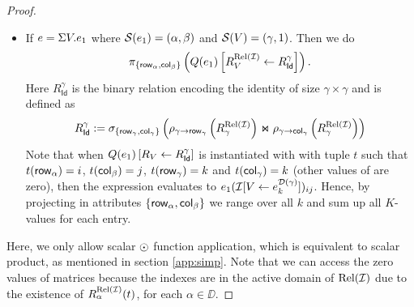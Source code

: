\begin{proof}
\begin{itemize}
  \item If $e=\Sigma V. e_1$ where $\mathcal{S}(e_1)=(\alpha,\beta)$ and $\mathcal{S}(V)=(\gamma,1)$. Then we do 
  $$
  \pi_{\lbrace \mathsf{row}_{\alpha}, \mathsf{col}_{\beta} \rbrace}\left( Q (e_1)\left[ R_{V}^{\text{Rel}(\mathcal{I})}\leftarrow R_{\mathsf{Id}}^{\gamma} \right] \right).
  $$
  Here $R_{\mathsf{Id}}^{\gamma}$ is the binary relation encoding the identity of size $\gamma\times\gamma$ and
  is defined as 
  $$
  R_{\mathsf{Id}}^{\gamma}:= \sigma_{\lbrace \mathsf{row}_{\gamma},\mathsf{col}_{\gamma} \rbrace }\left( \rho_{\gamma\rightarrow\mathsf{row}_\gamma}\left( R_\gamma^{\text{Rel}(\mathcal{I})} \right) \Join \rho_{\gamma\rightarrow\mathsf{col}_\gamma}\left( R_\gamma^{\text{Rel}(\mathcal{I})} \right)\right)
  $$
  Note that when $Q (e_1)\left[ R_{V}\leftarrow R_{\mathsf{Id}}^{\gamma} \right]$ is instantiated with with tuple $t$ such that $t(\mathsf{row}_\alpha)=i$, $t(\mathsf{col}_\beta)=j$, 
  $t(\mathsf{row}_\gamma)=k$ and $t(\mathsf{col}_\gamma)=k$ (other values of are zero),
  then the expression evaluates to $e_1(\mathcal{I} [V\leftarrow e_{k}^{\mathcal{D}(\gamma)}])_{ij}$. 
  Hence, by projecting in attributes $\lbrace \mathsf{row}_\alpha, \mathsf{col}_\beta\rbrace$ we range over all $k$ and sum up all $K$-values for each entry.
\end{itemize}

Here, we only allow scalar $\odot$ function application, 
which is equivalent to scalar product, as mentioned in section \ref{app:simp}.
Note that we can access the zero values of matrices because the indexes are in the active domain of $\text{Rel}(\mathcal{I})$ due to the existence of $R_\alpha^{\text{Rel}(\mathcal{I})}(t)$, for each $\alpha \in \DD$.

\end{proof}


